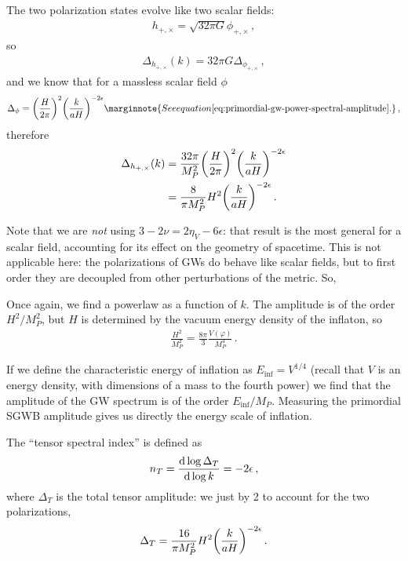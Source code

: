 \documentclass[main.tex]{subfiles}
\begin{document}
The two polarization states evolve like two scalar fields:
%
\begin{align}
h_{+, \times } = \sqrt{32 \pi G} \phi_{+, \times}
\,,
\end{align}
%
so 
%
\begin{align}
\Delta_{h_{+, \times }} (k) = 32 \pi G \Delta_{\phi_{+, \times }}
\,,
\end{align}
%
and we know that for a massless scalar field \(\phi  \)
%
\begin{align}
\Delta_{\phi} = \qty(\frac{H}{2 \pi })^{2} \qty(\frac{k}{aH})^{-2\epsilon }
\marginnote{See equation \eqref{eq:primordial-gw-power-spectral-amplitude}.}
\,,
\end{align}
%
therefore 
%
\begin{align}
\Delta_{h_{+, \times }} (k)
&= \frac{32 \pi }{M_P^2} \qty(\frac{H}{2 \pi })^2 \qty(\frac{k}{aH})^{-2 \epsilon }  \\
&= \frac{8}{\pi M_P^2} H^2 \qty(\frac{k}{aH})^{-2 \epsilon }
\,.
\end{align}

Note that we are \emph{not} using \(3- 2\nu = 2 \eta _V - 6 \epsilon \): that result is the most general for a scalar field, accounting for its effect on the geometry of spacetime. This is not applicable here: the polarizations of GWs do behave like scalar fields, but to first order they are decoupled from other perturbations of the metric. So, 

Once again, we find a powerlaw as a function of \(k\). 
The amplitude is of the order \(H^2 / M_P^2\), but \(H\) is determined by the vacuum energy density of the inflaton, so 
%
\begin{align}
\frac{H^2}{M_P^2} = \frac{8 \pi }{3} \frac{V(\varphi )}{M_P^4}
\,.
\end{align}

If we define the characteristic energy of inflation as \(E_{\text{inf}} = V^{1/4}\) (recall that \(V\) is an energy density, with dimensions of a mass to the fourth power) we find that the amplitude of the GW spectrum is of the order \(E _{\text{inf}} / M_P\). 
Measuring the primordial SGWB amplitude gives us directly the energy scale of inflation. 

The ``tensor spectral index'' is defined as 
%
\begin{align}
n_T = \dv{\log \Delta _T}{\log k} = - 2 \epsilon 
\,,
\end{align}
%
where \(\Delta _T\) is the total tensor amplitude: we just by 2 to account for the two polarizations,
%
\begin{align}
\Delta_T = \frac{16}{\pi M_P^2} H^2 \qty(\frac{k}{aH})^{-2\epsilon }
\,.
\end{align}
\end{document}
